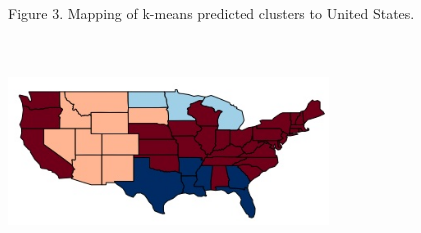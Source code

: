 \documentclass[conference]{IEEEtran}
\begin{document}
Figure 3. Mapping of k-means predicted clusters to United States.

\includegraphics[width=8.5cm, height=6cm]{cluster_on_map.jpg}
\end{document}
